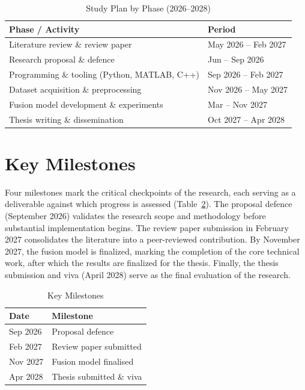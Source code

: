\documentclass[conference]{IEEEtran}
\begin{document}
\begin{table}[h]
\caption{Study Plan by Phase (2026--2028)}
\label{tab:plan}
\centering
\small
\begin{tabular}{p{3.6cm}p{4.0cm}}
\toprule
\textbf{Phase / Activity} & \textbf{Period} \\
\midrule
Literature review \& review paper & May 2026 -- Feb 2027 \\
Research proposal \& defence & Jun -- Sep 2026 \\
Programming \& tooling (Python, MATLAB, C++) & Sep 2026 -- Feb 2027 \\
Dataset acquisition \& preprocessing & Nov 2026 -- May 2027 \\
Fusion model development \& experiments & Mar -- Nov 2027 \\
Thesis writing \& dissemination & Oct 2027 -- Apr 2028 \\
\bottomrule
\end{tabular}
\end{table}
 

\section{Key Milestones}
 
Four milestones mark the critical checkpoints of the research, each serving as a deliverable against which progress is assessed (Table~\ref{tab:milestones}). The proposal defence (September 2026) validates the research scope and methodology before substantial implementation begins. The review paper submission in February 2027 consolidates the literature into a peer-reviewed contribution. By November 2027, the fusion model is finalized, marking the completion of the core technical work, after which the results are finalized for the thesis. Finally, the thesis submission and viva (April 2028) serve as the final evaluation of the research.
 
\begin{table}[h]
\caption{Key Milestones}
\label{tab:milestones}
\centering
\small
\begin{tabular}{p{2.0cm}p{5.6cm}}
\toprule
\textbf{Date} & \textbf{Milestone} \\
\midrule
Sep 2026 & Proposal defence \\
Feb 2027 & Review paper submitted \\
Nov 2027 & Fusion model finalised \\
Apr 2028 & Thesis submitted \& viva \\
\bottomrule
\end{tabular}
\end{table}
\end{document}
